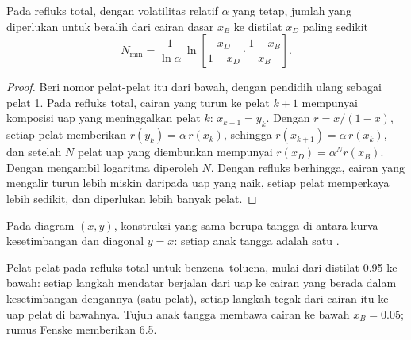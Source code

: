 \begin{proposition}\label{prop:b2:liquid-vapour-diagrams:fenske}
Pada refluks total, dengan volatilitas relatif $\alpha$ yang tetap, jumlah
 yang diperlukan untuk beralih dari cairan dasar $x_B$ ke
distilat $x_D$ paling sedikit
\[
  N_{\min} = \frac{1}{\ln\alpha}\,\ln\!\left[\frac{x_D}{1 - x_D}\cdot\frac{1 - x_B}{x_B}\right] .
\]
\end{proposition}

\begin{proof}
Beri nomor pelat-pelat itu dari bawah, dengan pendidih ulang sebagai pelat
1. Pada refluks total, cairan yang turun ke pelat $k + 1$ mempunyai
komposisi uap yang meninggalkan pelat $k$: $x_{k+1} = y_k$. Dengan
$r = x/(1 - x)$, setiap pelat memberikan $r(y_k) = \alpha\,r(x_k)$,
sehingga $r(x_{k+1}) = \alpha\,r(x_k)$, dan setelah $N$ pelat uap yang
diembunkan mempunyai $r(x_D) = \alpha^N r(x_B)$. Dengan mengambil
logaritma diperoleh $N$. Dengan refluks berhingga, cairan yang mengalir
turun lebih miskin daripada uap yang naik, setiap pelat memperkaya lebih
sedikit, dan diperlukan lebih banyak pelat.
\end{proof}

Pada diagram $(x, y)$, konstruksi yang sama berupa tangga di antara kurva
kesetimbangan dan diagonal $y = x$: setiap anak tangga adalah satu .

\begin{omfigure}

{\small Pelat-pelat pada refluks total untuk benzena--toluena, mulai dari
distilat 0.95 ke bawah: setiap langkah mendatar berjalan dari uap ke
cairan yang berada dalam kesetimbangan dengannya (satu pelat), setiap
langkah tegak dari cairan itu ke uap pelat di bawahnya. Tujuh anak tangga
membawa cairan ke bawah $x_B = 0.05$; rumus Fenske memberikan 6.5.}
\end{omfigure}

